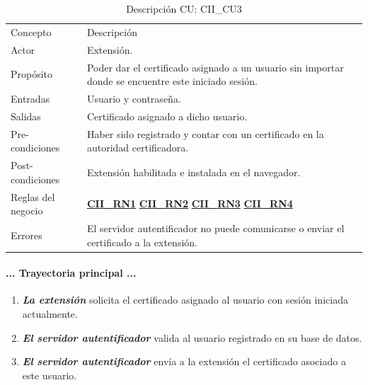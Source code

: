 \documentclass[12pt, a4paper, titlepage]{report}
\begin{document}
		\begin{table}[H]
			\begin{tabular}{ |p{3.5cm}||p{9.5cm}|}
				\hline
				\rowcolor{guindapoli}
				\multicolumn{2}{|c|}{\textbf{\textcolor{white}{Caso de uso: CII\_CU3. Obtener certificado.}}}\\
				\hline
				\rowcolor{azulfuerte}Concepto & Descripción\\
				\hline
				\cellcolor{azulclaro}Actor & 
				Extensión.\\ 
				\hline
				\cellcolor{azulclaro}Propósito &
				Poder dar el certificado asignado a un usuario sin importar donde se encuentre este iniciado sesión.\\
				\hline
				\cellcolor{azulclaro}Entradas &
				Usuario y contraseña.\\
				\hline
				\cellcolor{azulclaro}Salidas &
				Certificado asignado a dicho usuario.\\
				\hline
				\cellcolor{azulclaro}Pre-condiciones&
				Haber sido registrado y contar con un certificado en la autoridad certificadora.\\
				\hline
				\cellcolor{azulclaro}Post-condiciones&
				Extensión habilitada e instalada en el navegador.\\
				\hline
				\cellcolor{azulclaro}Reglas del negocio&
				\hyperref[CII_RN1]{\textbf{CII\_RN1}} \newline
				\hyperref[CII_RN2]{\textbf{CII\_RN2}} \newline
				\hyperref[CII_RN3]{\textbf{CII\_RN3}} \newline
				\hyperref[CII_RN4]{\textbf{CII\_RN4}} \\
				\hline
				\cellcolor{azulclaro}Errores &
				El servidor autentificador no puede comunicarse o enviar el certificado a la extensión.\\					
				\hline
		    \end{tabular}
		    \caption[DCU: CII\_CU3]{Descripción CU: CII\_CU3}
		\end{table}
		
		
		\paragraph{... Trayectoria principal ...}
		    \begin{enumerate}
		        \item \textbf{\textit{La extensión}} solicita el certificado asignado al usuario con sesión iniciada actualmente.
		        
		        \item \textbf{\textit{El servidor autentificador}} valida al usuario registrado en su base de datos.
		        
		        \item \textbf{\textit{El servidor autentificador}} envía a la extensión el certificado asociado a este usuario.
		    \end{enumerate}
\end{document}
